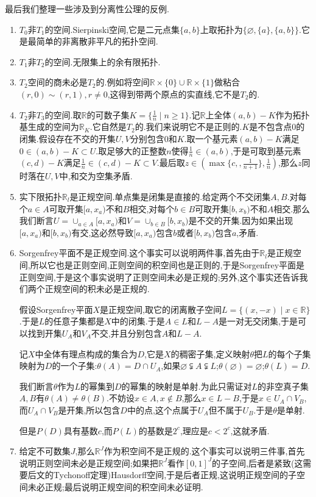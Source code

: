 最后我们整理一些涉及到分离性公理的反例.
\begin{enumerate}
	\item $T_0$非$T_1$的空间.Sierpinski空间,它是二元点集$\{a,b\}$上取拓扑为$\{\varnothing,\{a\},\{a,b\}\}$.它是最简单的非离散非平凡的拓扑空间.
	\item $T_1$非$T_2$的空间.无限集上的余有限拓扑.
	\item $T_2$空间的商未必是$T_2$的.例如将空间$\mathbb{R}\times\{0\}\cup\mathbb{R}\times\{1\}$做粘合$(r,0)\sim(r,1),r\not=0$,这得到带两个原点的实直线,它不是$T_2$的.
	\item $T_2$非$T_3$的空间.取$\mathbb{R}$的可数子集$K=\{\frac{1}{n}\mid n\ge1\}$.记$\mathbb{R}$上全体$(a,b)-K$作为拓扑基生成的空间为$\mathbb{R}_K$.它自然是$T_2$的.我们来说明它不是正则的.$K$是不包含点$0$的闭集.假设存在不交的开集$U,V$分别包含$0$和$K$.取一个基元素$(a,b)-K$满足$0\in (a,b)-K\subset U$.取足够大的正整数$n$使得$\frac{1}{n}\in(a,b)$,于是可取到基元素$(c,d)-K$满足$\frac{1}{n}\in(c,d)-K\subset V$.最后取$z\in(\max\{c,,\frac{1}{n+1}\},\frac{1}{n})$,那么$z$同时落在$U,V$中,和交为空集矛盾.
	\item 实下限拓扑$\mathbb{R}_l$是正规空间.单点集是闭集是直接的.给定两个不交闭集$A,B$.对每个$a\in A$可取开集$[a,x_a)$不和$B$相交,对每个$b\in B$可取开集$[b,x_b)$不和$A$相交.那么我们断言$U=\cup_{a\in A}[a,x_a)$和$V=\cup_{b\in B}[b,x_b)$是不交的开集.因为如果出现$[a,x_a)$和$[b,x_b)$有交,这必然导致$[a,x_a)$包含$b$或者$[b,x_b)$包含$a$,矛盾.
	\item Sorgenfrey平面不是正规空间.这个事实可以说明两件事,首先由于$\mathbb{R}_l$是正规空间,所以它也是正则空间,正则空间的积空间也是正则的,于是Sorgenfrey平面是正则空间,于是这个事实说明了正则空间未必是正规的;另外,这个事实还告诉我们两个正规空间的积未必是正规的.
	
	假设Sorgenfrey平面$X$是正规空间,取它的闭离散子空间$L=\{(x,-x)\mid x\in\mathbb{R}\}$.于是$L$的任意子集都是$X$中的闭集.于是$A\in L$和$L-A$是一对无交闭集,于是可以找到开集$U_A$和$V_A$不交,并且分别包含$A$和$L-A$.
	
	记$X$中全体有理点构成的集合为$D$,它是$X$的稠密子集,定义映射$\theta$把$L$的每个子集映射为$D$的一个子集:$\theta(A)=D\cap U_A$,如果$\varnothing\subsetneqq A\subsetneqq L$;$\theta(\varnothing)=\varnothing$;$\theta(L)=D$.
	
	我们断言$\theta$作为$L$的幂集到$D$的幂集的映射是单射.为此只需证对$L$的非空真子集$A,B$有$\theta(A)\not=\theta(B)$.不妨设$x\in A,x\not\in B$,那么$x\in L-B$,于是$x\in U_A\cap V_B$,而$U_A\cap V_B$是开集,所以包含$D$中的点,这个点属于$U_A$但不属于$U_B$.于是$\theta$是单射.
	
	但是$P(D)$具有基数$c$,而$P(L)$的基数是$2^c$,理应是$c<2^c$,这就矛盾.
	
	\item 给定不可数集$J$,那么$\mathbb{R}^J$作为积空间不是正规的.这个事实可以说明三件事,首先说明正则空间未必是正规空间;如果把$\mathbb{R}^J$看作$[0,1]^J$的子空间,后者是紧致(这需要后文的Tychonoff定理)Hausdorff空间,于是后者正规,这说明正规空间的子空间未必正规;最后说明正规空间的积空间未必证明.
\end{enumerate}
\newpage

